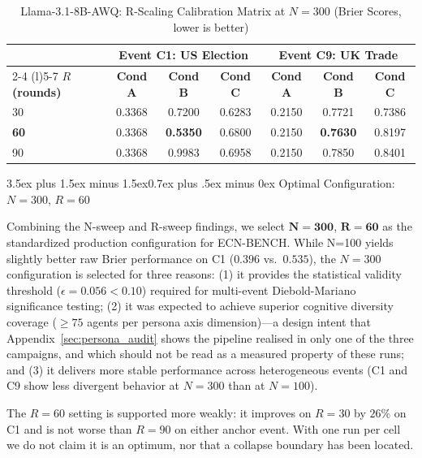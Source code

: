 \documentclass[11pt,journal,onecolumn]{IEEEtran}
\makeatletter
\renewcommand\subsection{\@startsection{subsection}{2}{\z@}%
  {3.5ex plus 1.5ex minus 1.5ex}{0.7ex plus .5ex minus 0ex}%
  {\normalfont\normalsize\bfseries}}
\makeatother
\begin{document}
\begin{table}[!htbp]
\centering
\caption{Llama-3.1-8B-AWQ: R-Scaling Calibration Matrix at $N=300$ (Brier Scores, lower is better)}
\label{tab:r_sweep_results}
\begin{tabular}{lcccccc}
\toprule
 & \multicolumn{3}{c}{\textbf{Event C1: US Election}} & \multicolumn{3}{c}{\textbf{Event C9: UK Trade}} \\
\cmidrule(r){2-4} \cmidrule(l){5-7}
\textbf{$R$ (rounds)} & \textbf{Cond A} & \textbf{Cond B} & \textbf{Cond C} & \textbf{Cond A} & \textbf{Cond B} & \textbf{Cond C} \\
\midrule
30  & 0.3368 & 0.7200 & 0.6283 & 0.2150 & 0.7721 & 0.7386 \\
\textbf{60}  & 0.3368 & \textbf{0.5350} & 0.6800 & 0.2150 & \textbf{0.7630} & 0.8197 \\
90  & 0.3368 & 0.9983 & 0.6958 & 0.2150 & 0.7850 & 0.8401 \\
\bottomrule
\end{tabular}
\setlength{\tabcolsep}{6pt}
\end{table}

\subsection{Optimal Configuration: $N=300$, $R=60$}
\label{sec:optimal_config}

Combining the N-sweep and R-sweep findings, we select $\mathbf{N=300}$, $\mathbf{R=60}$ as the standardized production configuration for ECN-BENCH. While N=100 yields slightly better raw Brier performance on C1 ($0.396$ vs.~$0.535$), the $N=300$ configuration is selected for three reasons:
(1) it provides the statistical validity threshold ($\epsilon = 0.056 < 0.10$) required for multi-event Diebold-Mariano significance testing;
(2) it was expected to achieve superior cognitive diversity coverage ($\geq 75$ agents per persona axis dimension)---a design intent that Appendix~\ref{sec:persona_audit} shows the pipeline realised in only one of the three campaigns, and which should not be read as a measured property of these runs; and
(3) it delivers more stable performance across heterogeneous events (C1 and C9 show less divergent behavior at $N=300$ than at $N=100$).

The $R=60$ setting is supported more weakly: it improves on $R=30$ by $26\%$ on C1 and is not worse than $R=90$ on either anchor event. With one run per cell we do not claim it is an optimum, nor that a collapse boundary has been located.
\end{document}
